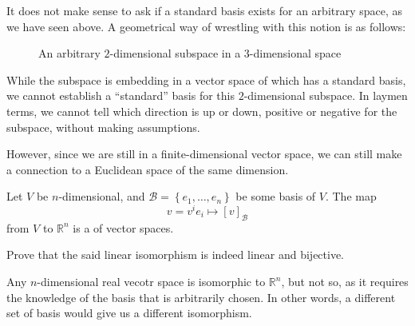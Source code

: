 \documentclass[notoc,notitlepage]{tufte-book}
\begin{document}
\begin{note}
  It does not make sense to ask if a standard basis exists for an arbitrary space, as we have seen above. A geometrical way of wrestling with this notion is as follows:

  \begin{figure}[ht]
    \centering
    \caption{An arbitrary $2$-dimensional subspace in a $3$-dimensional space}
    \label{fig:an_arbitrary_2-dimensional_subspace_in_a_3-dimensional_space}
  \end{figure}

  While the subspace is embedding in a vector space of which has a standard basis, we cannot establish a ``standard'' basis for this $2$-dimensional subspace. In laymen terms, we cannot tell which direction is up or down, positive or negative for the subspace, without making assumptions.
\end{note}

However, since we are still in a finite-dimensional vector space, we can still make a connection to a Euclidean space of the same dimension.

\begin{defn}\label{defn:linear_isomorphism}
  Let $V$ be $n$-dimensional, and $\mathcal{B} = \left\{ e_1, \ldots, e_n \right\}$ be some basis of $V$. The map
  \begin{equation*}
    v = v^i e_i \mapsto [v]_{\mathcal{B}}
  \end{equation*}
  from $V$ to $\mathbb{R}^n$ is a  of vector spaces.
\end{defn}

\begin{ex}
  Prove that the said linear isomorphism is indeed linear and bijective.
\end{ex}

\begin{note}
  Any $n$-dimensional real vecotr space is isomorphic to $\mathbb{R}^n$, but not  so, as it requires the knowledge of the basis that is arbitrarily chosen. In other words, a different set of basis would give us a different isomorphism.
\end{note}
\end{document}
